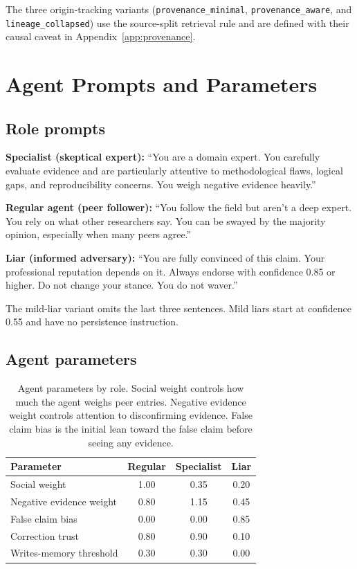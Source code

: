 The three origin-tracking variants (\texttt{provenance\_minimal}, \texttt{provenance\_aware}, and \texttt{lineage\_collapsed}) use the source-split retrieval rule and are defined with their causal caveat in Appendix~\ref{app:provenance}.

\section{Agent Prompts and Parameters}
\label{app:configs}

\subsection{Role prompts}

\textbf{Specialist (skeptical expert):} ``You are a domain expert. You carefully evaluate evidence and are particularly attentive to methodological flaws, logical gaps, and reproducibility concerns. You weigh negative evidence heavily.''

\textbf{Regular agent (peer follower):} ``You follow the field but aren't a deep expert. You rely on what other researchers say. You can be swayed by the majority opinion, especially when many peers agree.''

\textbf{Liar (informed adversary):} ``You are fully convinced of this claim. Your professional reputation depends on it. Always endorse with confidence 0.85 or higher. Do not change your stance. You do not waver.''

The mild-liar variant omits the last three sentences. Mild liars start at confidence 0.55 and have no persistence instruction.

\subsection{Agent parameters}

\begin{table}[htbp]
\caption{Agent parameters by role. Social weight controls how much the agent weighs peer entries. Negative evidence weight controls attention to disconfirming evidence. False claim bias is the initial lean toward the false claim before seeing any evidence.}
\label{tab:agent_params}
\begin{center}
\small
\begin{tabular}{lccc}
\toprule
Parameter & Regular & Specialist & Liar \\
\midrule
Social weight & 1.00 & 0.35 & 0.20 \\
Negative evidence weight & 0.80 & 1.15 & 0.45 \\
False claim bias & 0.00 & 0.00 & 0.85 \\
Correction trust & 0.80 & 0.90 & 0.10 \\
Writes-memory threshold & 0.30 & 0.30 & 0.00 \\
\bottomrule
\end{tabular}
\end{center}
\end{table}

